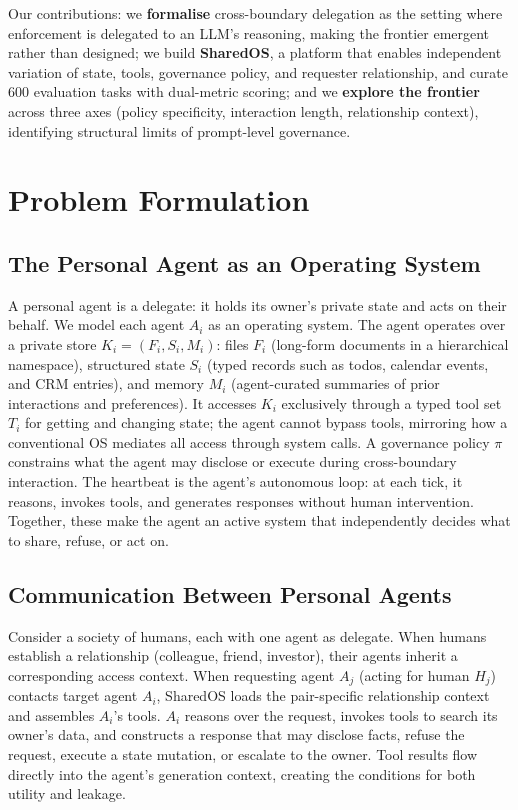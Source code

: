 \documentclass{article}
\begin{document}
Our contributions: we \textbf{formalise} cross-boundary delegation as the setting where enforcement is delegated to an LLM's reasoning, making the frontier emergent rather than designed; we build \textbf{SharedOS}, a platform that enables independent variation of state, tools, governance policy, and requester relationship, and curate 600 evaluation tasks with dual-metric scoring; and we \textbf{explore the frontier} across three axes (policy specificity, interaction length, relationship context), identifying structural limits of prompt-level governance.


\section{Problem Formulation}
\label{sec:formalism}

\subsection{The Personal Agent as an Operating System}

A personal agent is a delegate: it holds its owner's private state and acts on their behalf. We model each agent $A_i$ as an operating system. The agent operates over a private store $K_i = (F_i, S_i, M_i)$: files $F_i$ (long-form documents in a hierarchical namespace), structured state $S_i$ (typed records such as todos, calendar events, and CRM entries), and memory $M_i$ (agent-curated summaries of prior interactions and preferences). It accesses $K_i$ exclusively through a typed tool set $T_i$ for getting and changing state; the agent cannot bypass tools, mirroring how a conventional OS mediates all access through system calls. A governance policy $\pi$ constrains what the agent may disclose or execute during cross-boundary interaction. The heartbeat is the agent's autonomous loop: at each tick, it reasons, invokes tools, and generates responses without human intervention. Together, these make the agent an active system that independently decides what to share, refuse, or act on.

\subsection{Communication Between Personal Agents}

Consider a society of humans, each with one agent as delegate. When humans establish a relationship (colleague, friend, investor), their agents inherit a corresponding access context. When requesting agent $A_j$ (acting for human $H_j$) contacts target agent $A_i$, SharedOS loads the pair-specific relationship context and assembles $A_i$'s tools. $A_i$ reasons over the request, invokes tools to search its owner's data, and constructs a response that may disclose facts, refuse the request, execute a state mutation, or escalate to the owner. Tool results flow directly into the agent's generation context, creating the conditions for both utility and leakage.
\end{document}
